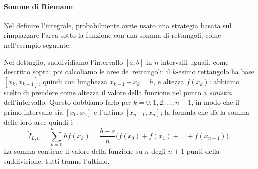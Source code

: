 \documentclass[a4paper]{report}
\theoremstyle{definiton}
\theoremstyle{remark}
\begin{document}
\paragraph{Somme di Riemann}
Nel definire l'integrale, probabilmente avete usato una strategia basata sul rimpiazzare l'area sotto la funzione con una somma di rettangoli, come nell'esempio seguente.
\begin{center}
\end{center}
Nel dettaglio, suddividiamo l'intervallo $[a,b]$ in $n$ intervalli uguali, come descritto sopra; poi calcoliamo le aree dei rettangoli: il $k$-esimo rettangolo ha base $[x_{k},x_{k+1}]$, quindi con lunghezza $x_{k+1}-x_k=h$, e altezza $f(x_k)$: abbiamo scelto di prendere come altezza il valore della funzione nel punto a \emph{sinistra} dell'intervallo. Questo dobbiamo farlo per $k=0,1,2,\dots,n-1$, in modo che il primo intervallo sia $[x_0,x_1]$ e l'ultimo $[x_{n-1},x_n]$; la formula che dà la somma delle loro aree quindi è
\[
\tilde{I}_{L,n} = \sum_{k=0}^{n-1} hf(x_k) = \frac{b-a}{n} \biggl( f(x_0) + f(x_1) + \dots + f(x_{n-1}) \biggr).
\]
La somma contiene il valore della funzione su $n$ degli $n+1$ punti della suddivisione, tutti tranne l'ultimo.
\end{document}
